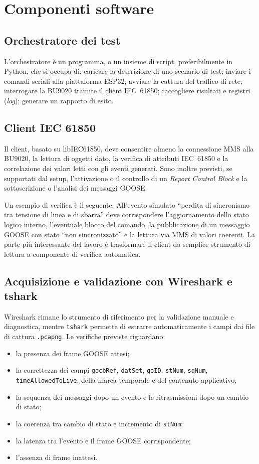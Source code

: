 \documentclass[11pt,a4paper,italian,oneside,openany]{book}
\begin{document}
\section{Componenti software}
\subsection{Orchestratore dei test}
L'orchestratore è un programma, o un insieme di script, preferibilmente in Python, che si occupa di: caricare la descrizione di uno scenario di test; inviare i comandi seriali alla piattaforma ESP32; avviare la cattura del traffico di rete; interrogare la BU9020 tramite il client IEC~61850; raccogliere risultati e registri (\textit{log}); generare un rapporto di esito.

\subsection{Client IEC 61850}
Il client, basato su libIEC61850, deve consentire almeno la connessione MMS alla BU9020, la lettura di oggetti dato, la verifica di attributi IEC~61850 e la correlazione dei valori letti con gli eventi generati. Sono inoltre previsti, se supportati dal setup, l'attivazione o il controllo di un \textit{Report Control Block} e la sottoscrizione o l'analisi dei messaggi GOOSE.

Un esempio di verifica è il seguente. All'evento simulato \enquote{perdita di sincronismo tra tensione di linea e di sbarra} deve corrispondere l'aggiornamento dello stato logico interno, l'eventuale blocco del comando, la pubblicazione di un messaggio GOOSE con stato \enquote{non sincronizzato} e la lettura via MMS di valori coerenti. La parte più interessante del lavoro è trasformare il client da semplice strumento di lettura a componente di verifica automatica.

\subsection{Acquisizione e validazione con Wireshark e tshark}
Wireshark rimane lo strumento di riferimento per la validazione manuale e diagnostica, mentre \texttt{tshark} permette di estrarre automaticamente i campi dai file di cattura \texttt{.pcapng}. Le verifiche previste riguardano:
\begin{itemize}
    \item la presenza dei frame GOOSE attesi;
    \item la correttezza dei campi \texttt{gocbRef}, \texttt{datSet}, \texttt{goID}, \texttt{stNum}, \texttt{sqNum}, \texttt{timeAllowedToLive}, della marca temporale e del contenuto applicativo;
    \item la sequenza dei messaggi dopo un evento e le ritrasmissioni dopo un cambio di stato;
    \item la coerenza tra cambio di stato e incremento di \texttt{stNum};
    \item la latenza tra l'evento e il frame GOOSE corrispondente;
    \item l'assenza di frame inattesi.
\end{itemize}
\end{document}
